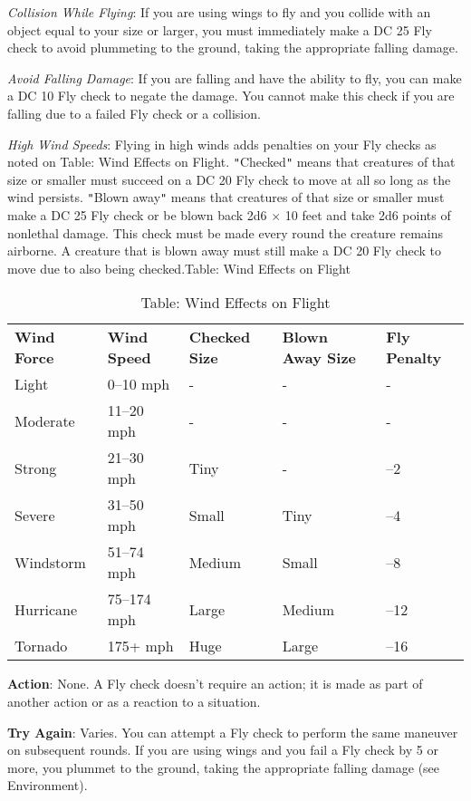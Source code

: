 \textit{Collision While Flying}: If you are using wings to fly and you collide with an object equal to your size or larger, you must immediately make a DC 25 Fly check to avoid plummeting to the ground, taking the appropriate falling damage.
				
\textit{Avoid Falling Damage}: If you are falling and have the ability to fly, you can make a DC 10 Fly check to negate the damage. You cannot make this check if you are falling due to a failed Fly check or a collision.
				
\textit{High Wind Speeds}: Flying in high winds adds penalties on your Fly checks as noted on Table: Wind Effects on Flight. \texttt{{}"{}}Checked\texttt{{}"{}} means that creatures of that size or smaller must succeed on a DC 20 Fly check to move at all so long as the wind persists. \texttt{{}"{}}Blown away\texttt{{}"{}} means that creatures of that size or smaller must make a DC 25 Fly check or be blown back 2d6 \mbox{$\times$} 10 feet and take 2d6 points of nonlethal damage. This check must be made every round the creature remains airborne. A creature that is blown away must still make a DC 20 Fly check to move due to also being checked.Table: Wind Effects on Flight
\begin{table}[]
\sffamily
\caption{Table: Wind Effects on Flight}
\begin{tabular}{lllll}
\textbf{Wind Force} & \textbf{Wind Speed} & \textbf{Checked Size} & \textbf{Blown Away Size} & \textbf{Fly Penalty}\\
Light& 0–10 mph& -& -& - \\
Moderate& 11–20 mph& -& -& - \\
Strong& 21–30 mph& Tiny& -& –2 \\
Severe& 31–50 mph& Small& Tiny& –4 \\
Windstorm& 51–74 mph& Medium& Small& –8 \\
Hurricane& 75–174 mph& Large& Medium& –12 \\
Tornado& 175+ mph& Huge& Large& –16\\
\end{tabular}
\end{table}

				
\textbf{Action}: None. A Fly check doesn't require an action; it is made as part of another action or as a reaction to a situation.
				
\textbf{Try Again}: Varies. You can attempt a Fly check to perform the same maneuver on subsequent rounds. If you are using wings and you fail a Fly check by 5 or more, you plummet to the ground, taking the appropriate falling damage (see Environment).
				
